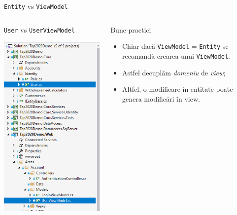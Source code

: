 \documentclass[presentation]{beamer}
\begin{document}
\begin{frame}[label={sec:org7854704},fragile]{\texttt{Entity} vs \texttt{ViewModel}}
 \begin{columns}
\begin{column}{0.4\columnwidth}
\begin{block}{\texttt{User} vs \texttt{UserViewModel}}
\begin{center}
\includegraphics[height=.8\textheight]{img/entity-vs-view-model.png}
\end{center}
\end{block}
\end{column}
\begin{column}{0.6\columnwidth}
\begin{block}{Bune practici}
\begin{itemize}
\item Chiar dacă \texttt{ViewModel} = \texttt{Entity} se recomandă crearea unui \texttt{ViewModel}.
\item Astfel decuplăm \emph{domeniu} de \emph{view};
\item Altfel, o modificare în entitate poate genera modificări în view.
\end{itemize}
\end{block}
\end{column}
\end{columns}
\end{frame}
\end{document}

